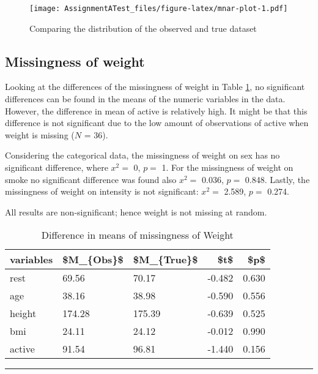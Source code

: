 \documentclass[
]{article}
\begin{document}
\begin{figure}
\centering
\texttt{[image: AssignmentATest\_files/figure-latex/mnar-plot-1.pdf]}
\caption{\label{fig:mnar-plot}Comparing the distribution of the observed and true dataset}
\end{figure}

\hypertarget{missW}{%
\subsection{Missingness of weight}\label{missW}}

Looking at the differences of the missingness of weight in Table \ref{tab:missW}, no significant differences can be found in the means of the numeric variables in the data. However, the difference in mean of active is relatively high. It might be that this difference is not significant due to the low amount of observations of active when weight is missing (\(N\) = 36).

Considering the categorical data, the missingness of weight on sex has no significant difference, where \(x^2 =\) 0, \(p =\) 1. For the missingness of weight on smoke no significant difference was found also \(x^2 =\) 0.036, \(p =\) 0.848. Lastly, the missingness of weight on intensity is not significant: \(x^2 =\) 2.589, \(p =\) 0.274.

All results are non-significant; hence weight is not missing at random.

\begin{table}

\caption{\label{tab:missW}Difference in means of missingness of Weight}
\centering
\begin{tabular}[t]{l|l|l|r|r}
\hline
variables & \$M\_\{Obs\}\$ & \$M\_\{True\}\$ & \$t\$ & \$p\$\\
\hline
rest & 69.56 & 70.17 & -0.482 & 0.630\\
\hline
age & 38.16 & 38.98 & -0.590 & 0.556\\
\hline
height & 174.28 & 175.39 & -0.639 & 0.525\\
\hline
bmi & 24.11 & 24.12 & -0.012 & 0.990\\
\hline
active & 91.54 & 96.81 & -1.440 & 0.156\\
\hline
\end{tabular}
\end{table}

\begin{center}\rule{0.5\linewidth}{0.5pt}\end{center}
\end{document}
